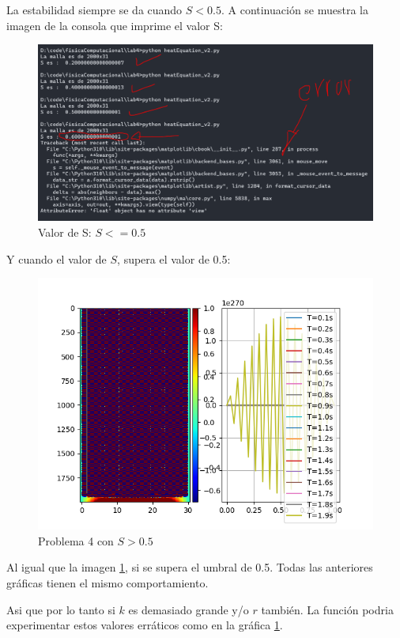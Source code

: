 \documentclass[a4paper,12pt]{article}
\newcommand{\eq}[1]{$#1$}
\begin{document}
    La estabilidad siempre se da cuando \eq{S < 0.5}. 
    A continuación se muestra la imagen de la consola que imprime el valor S:
    \begin{figure}[h]
        \centering
        \includegraphics[width=\textwidth]{console4.PNG}
        \caption{Valor de S: \eq{S <= 0.5}}
    \end{figure}
    \clearpage    
    Y cuando el valor de \eq{S}, supera el valor de 0.5:
    \begin{figure}[h]
        \centering
        \includegraphics[width=\textwidth]{ejer4_1_graph.png}
        \caption{Problema 4 con \eq{S > 0.5}}
        \label{fig:erratic}
    \end{figure}

    Al igual que la imagen \ref{fig:erratic}, si se supera el umbral de 0.5.
    Todas las anteriores gráficas tienen el mismo comportamiento.

    Asi que por lo tanto si \eq{k} es demasiado grande y/o \eq{r} también.
    La función podria experimentar estos valores erráticos como en la gráfica \ref{fig:erratic}.
\end{document}
